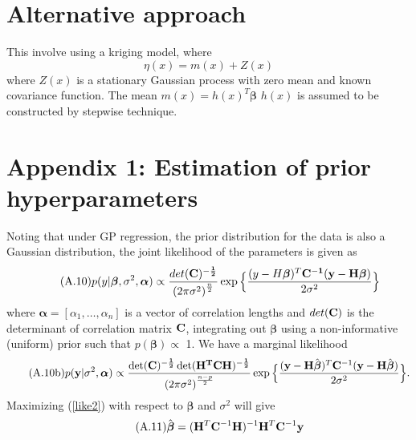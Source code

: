 \documentclass[12pt,titlepage]{report}
\newcommand{\bH}{{\bf H}}
\newcommand{\bC}{{\bf C}}
\newcommand{\by}{{\bf y}}
\newcommand{\hbbeta}{{\hat{\boldsymbol{\beta}}}}
\theoremstyle{definition}
\theoremstyle{remark}
\begin{document}
\section{Alternative approach}
This involve using a kriging model, where 
\begin{equation}
\eta(x) = m(x) + Z(x)
\end{equation}
where $Z(x)$ is a stationary Gaussian process with zero mean and known covariance function. The mean $m(x) = h(x)^T\boldsymbol \beta$
$h(x)$ is assumed to be constructed by stepwise technique.


\section*{Appendix 1: Estimation of prior hyperparameters}\label{hyper}
Noting that under GP regression, the prior distribution for the data is also a Gaussian distribution, the joint likelihood of the parameters is given as
\begin{equation}\tag{A.10}\label{like}
p(y|\boldsymbol \beta, \sigma^2, \boldsymbol{\alpha})\propto \frac{det(\bf C)^{-\frac{1}{2}}}{{(2\pi\sigma^2)}^\frac{n}{2}}\exp \Big \{\frac{(y-H\boldsymbol \beta)^T \bf C^{-1}(y-H\boldsymbol \beta)}{2\sigma^2}\Big\}
\end{equation}
where $\boldsymbol{\alpha}=[\alpha_1, \ldots, \alpha_n]$ is a vector of correlation lengths and $det(\bf C)$ is the determinant of correlation matrix $\bf C$, integrating out $\boldsymbol \beta$ using a non-informative (uniform) prior such that $p(\boldsymbol \beta) \propto$ 1. We have a marginal likelihood
\begin{equation}\tag{A.10b}\label{like2}
p(\by|\sigma^2, \boldsymbol{\alpha})\propto \frac{\det(\bf C)^{-\frac{1}{2}}\det(H^TCH)^{-\frac{1}{2}}}{{(2\pi\sigma^2)}^\frac{n-p}{2}}\exp \Big \{\frac{(\by-\bH\hbbeta)^T \bC^{-1}(\by-\bH\hbbeta)}{2\sigma^2}\Big\}.
\end{equation}
Maximizing (\ref{like2}) with respect to $\boldsymbol \beta$ and $\sigma^2$ will give %
\begin{equation}\tag{A.11}
\hbbeta=(\bH^T\bC^{-1}\bH)^{-1}\bH^T\bC^{-1}\by
\end{equation}
\end{document}
